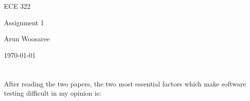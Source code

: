 \documentclass[letterpaper]{article}
\begin{document}
\begin{titlepage}
	\begin{center}
		\vspace*{1cm}
		\Huge
		ECE 322
		\vspace{1cm}

		Assignment 1
		\vspace{1cm}

		Arun Woosaree

		\today
		\vfill
	\end{center}
\end{titlepage}

\section{}
After reading the two papers, the two most essential factors which make software testing difficult in my opinion is:
\end{document}
